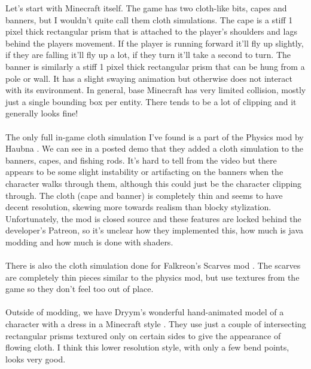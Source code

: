 \documentclass[12pt]{article}
\begin{document}
Let's start with Minecraft itself. The game has two cloth-like bits, capes and banners, but I wouldn't quite call them cloth simulations. The cape is a stiff 1 pixel thick rectangular prism that is attached to the player's shoulders and lags behind the players movement. If the player is running forward it'll fly up slightly, if they are falling it'll fly up a lot, if they turn it'll take a second to turn. The banner is similarly a stiff 1 pixel thick rectangular prism that can be hung from a pole or wall. It has a slight swaying animation but otherwise does not interact with its environment. In general, base Minecraft has very limited collision, mostly just a single bounding box per entity. There tends to be a lot of clipping and it generally looks fine!\\
\\
The only full in-game cloth simulation I've found is a part of the Physics mod by Haubna \cite{HaubnaPhysics}. We can see in a posted demo \cite{HaubnaCloth} that they added a cloth simulation to the banners, capes, and fishing rods. It's hard to tell from the video but there appears to be some slight instability or artifacting on the banners when the character walks through them, although this could just be the character clipping through. The cloth (cape and banner) is completely thin and seems to have decent resolution, skewing more towards realism than blocky stylization. Unfortunately, the mod is closed source and these features are locked behind the developer's Patreon, so it's unclear how they implemented this, how much is java modding and how much is done with shaders.\\
\\
There is also the cloth simulation done for Falkreon's Scarves mod \cite{Falkreon}. The scarves are completely thin pieces similar to the physics mod, but use textures from the game so they don't feel too out of place.\\
\\
Outside of modding, we have Dryym's wonderful hand-animated model of a character with a dress in a Minecraft style \cite{Dryym}. They use just a couple of intersecting rectangular prisms textured only on certain sides to give the appearance of flowing cloth. I think this lower resolution style, with only a few bend points, looks very good.
\end{document}
